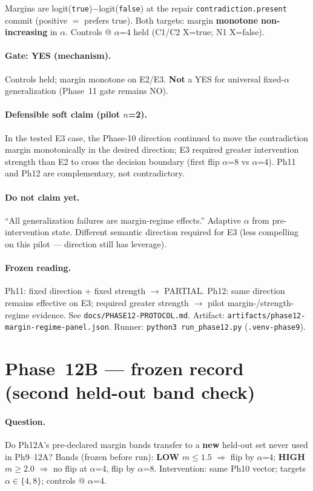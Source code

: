 \documentclass[11pt,a4paper]{article}
\begin{document}
Margins are logit(\texttt{true})${-}$logit(\texttt{false}) at the repair \texttt{contradiction.present} commit (positive $=$ prefers true). Both targets: margin \textbf{monotone non-increasing} in $\alpha$. Controls @ $\alpha$=4 held (C1/C2 X=true; N1 X=false).

\paragraph{Gate: YES (mechanism).}
Controls held; margin monotone on E2/E3. \textbf{Not} a YES for universal fixed-$\alpha$ generalization (Phase~11 gate remains NO).

\paragraph{Defensible soft claim (pilot $n$=2).}
In the tested E3 case, the Phase-10 direction continued to move the contradiction margin monotonically in the desired direction; E3 required greater intervention strength than E2 to cross the decision boundary (first flip $\alpha$=8 vs $\alpha$=4). Ph11 and Ph12 are complementary, not contradictory.

\paragraph{Do not claim yet.}
``All generalization failures are margin-regime effects.'' Adaptive $\alpha$ from pre-intervention state. Different semantic direction required for E3 (less compelling on this pilot --- direction still has leverage).

\paragraph{Frozen reading.}
Ph11: fixed direction + fixed strength $\rightarrow$ PARTIAL.
Ph12: same direction remains effective on E3; required greater strength $\rightarrow$ pilot margin-/strength-regime evidence.
See \texttt{docs/PHASE12-PROTOCOL.md}. Artifact: \texttt{artifacts/phase12-margin-regime-panel.json}.
Runner: \texttt{python3 run\_phase12.py} (\texttt{.venv-phase9}).

\section{Phase~12B --- frozen record (second held-out band check)}

\paragraph{Question.}
Do Ph12A's pre-declared margin bands transfer to a \textbf{new} held-out set never used in Ph9--12A?
Bands (frozen before run): \textbf{LOW} $m\leq 1.5$ $\Rightarrow$ flip by $\alpha$=4; \textbf{HIGH} $m\geq 2.0$ $\Rightarrow$ no flip at $\alpha$=4, flip by $\alpha$=8.
Intervention: same Ph10 vector; targets $\alpha\in\{4,8\}$; controls @ $\alpha$=4.
\end{document}

